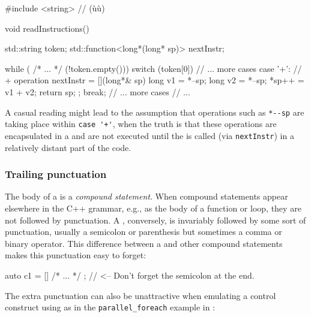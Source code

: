 \begin{emcppslisting}
#include <string>  // (ù{}ù)

void readInstructions()
{
    std::string                    token;
    std::function<long*(long* sp)> nextInstr;

    while ( /* ... */ (!token.empty()))
    {
        switch (token[0])
        {
            // ... more cases
            case '+':
            {
                // + operation
                nextInstr = [](long*& sp){
                    long v1 = *--sp;
                    long v2 = *--sp;
                    *sp++ = v1 + v2;
                    return sp;
                };
                break;
            }
            // ... more cases
        }
       // ...
    }
}
\end{emcppslisting}
    

A casual reading might lead to the assumption that operations such as
\lstinline!*--sp! are taking place within \lstinline!case!~\lstinline!'+'!, when
the truth is that these operations are encapsulated in a  and are not executed until the  is
called (via \lstinline!nextInstr!) in a relatively distant part of the
code.

\subsubsection[Trailing punctuation]{Trailing punctuation}\label{trailing-punctuation}

The body of a  is a \emph{compound statement}.
When compound statements appear elsewhere in the C++ grammar, e.g., as
the body of a function or loop, they are not followed by punctuation. A
, conversely, is invariably followed by some
sort of punctuation, usually a semicolon or parenthesis but sometimes a
comma or binary operator. This difference between a 
and other compound statements makes this punctuation easy to forget:

\begin{emcppslisting}
auto c1 = []{ /* ... */ };  // <-- Don't forget the semicolon at the end.
\end{emcppslisting}
    

The extra punctuation can also be unattractive when emulating a control
construct using  as in the
\lstinline!parallel_foreach! example in :

